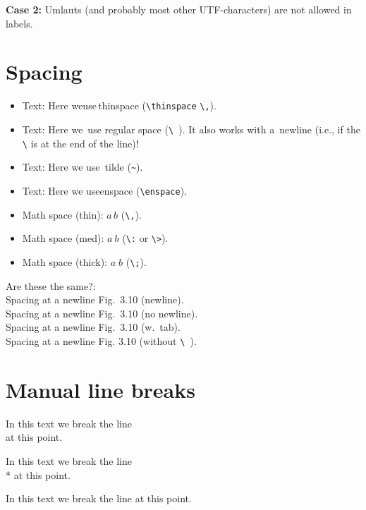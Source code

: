 \documentclass[a4paper]{article}
\begin{document}
\bigskip\noindent\textbf{Case 2:}
Umlauts (and probably most other UTF-characters) are not allowed in labels.




\section{Spacing}

\begin{itemize}
\item Text: Here we{\thinspace}use\,thinspace (\verb!\thinspace! \verb!\,!).
\item Text: Here we\ use regular space (\verb*!\ !).
It also works with a\
newline (i.e., if the \verb"\" is at the end of the line)!
\item Text: Here we use~tilde (\verb!~!).
\item Text: Here we use\enspace enspace (\verb!\enspace!).


\item Math space (thin): $a\,b$ (\verb!\,!).
\item Math space (med): $a\:b$ (\verb!\:! or \verb!\>!).
\item Math space (thick): $a\;b$ (\verb!\;!).
\end{itemize}

\noindent
Are these the same?:
\\
Spacing at a newline Fig.\
3.10 (newline).
\\
Spacing at a newline Fig.\ 3.10 (no newline).
\\
Spacing at a newline Fig.\	3.10 (w.\ tab).
\\
Spacing at a newline Fig. 3.10 (without \verb*!\ !).



\section{Manual line breaks}

\noindent
In this text we break the line\\
at this point.

\noindent
In this text we break the line\\*
at this point.


\noindent
In this text we break the line\linebreak
at this point.
\end{document}

